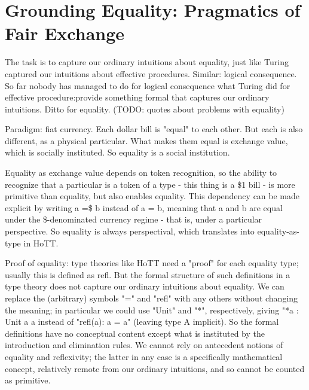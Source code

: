 \documentclass{article}
\begin{document}
\section{Grounding Equality: Pragmatics of Fair Exchange}

The task is to capture our ordinary intuitions about equality, just
like Turing captured our intuitions about effective procedures.
Similar: logical consequence.  So far nobody has managed to do for
logical consequence what Turing did for effective procedure:provide
something formal that captures our ordinary intuitions.  Ditto for
equality.  (TODO: quotes about problems with equality)

Paradigm: fiat currency.  Each dollar bill is "equal" to each other.
But each is also different, as a physical particular.  What makes them
equal is exchange value, which is socially instituted.  So equality is
a social institution.

Equality as exchange value depends on token recognition, so the
ability to recognize that a particular is a token of a type - this
thing is a \$1 bill - is more primitive than equality, but also enables
equality.  This dependency can be made explicit by writing a =\$ b
instead of a = b, meaning that a and b are equal under the
\$-denominated currency regime - that is, under a particular
perspective.  So equality is always perspectival, which translates
into equality-as-type in HoTT.

Proof of equality: type theories like HoTT need a "proof" for each
equality type; usually this is defined as refl.  But the formal
structure of such definitions in a type theory does not capture our
ordinary intuitions about equality.  We can replace the (arbitrary)
symbols "=" and "refl" with any others without changing the meaning;
in particular we could use "Unit" and "*", respectively, giving "*a :
Unit a a instead of "refl(a): a = a" (leaving type A implicit).  So
the formal definitions have no conceptual content except what is
instituted by the introduction and elimination rules.  We cannot rely
on antecedent notions of equality and reflexivity; the latter in any
case is a specifically mathematical concept, relatively remote from
our ordinary intuitions, and so cannot be counted as primitive.
\end{document}
